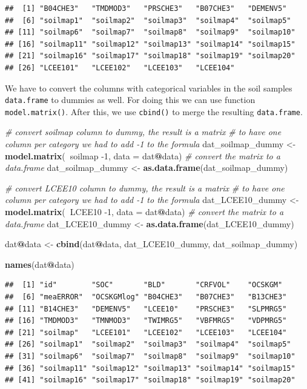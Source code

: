 \documentclass[10pt,b5paper,]{book}
\newenvironment{Shaded}{\begin{snugshade}}{\end{snugshade}}
\newcommand{\CommentTok}[1]{\textcolor[rgb]{0.56,0.35,0.01}{\textit{#1}}}
\newcommand{\DataTypeTok}[1]{\textcolor[rgb]{0.13,0.29,0.53}{#1}}
\newcommand{\DecValTok}[1]{\textcolor[rgb]{0.00,0.00,0.81}{#1}}
\newcommand{\KeywordTok}[1]{\textcolor[rgb]{0.13,0.29,0.53}{\textbf{#1}}}
\newcommand{\NormalTok}[1]{#1}
\newcommand{\OperatorTok}[1]{\textcolor[rgb]{0.81,0.36,0.00}{\textbf{#1}}}
\newcommand{\StringTok}[1]{\textcolor[rgb]{0.31,0.60,0.02}{#1}}
\theoremstyle{definition}
\theoremstyle{definition}
\theoremstyle{definition}
\theoremstyle{remark}
\begin{document}
\begin{verbatim}
##  [1] "B04CHE3"   "TMDMOD3"   "PRSCHE3"   "B07CHE3"   "DEMENV5"  
##  [6] "soilmap1"  "soilmap2"  "soilmap3"  "soilmap4"  "soilmap5" 
## [11] "soilmap6"  "soilmap7"  "soilmap8"  "soilmap9"  "soilmap10"
## [16] "soilmap11" "soilmap12" "soilmap13" "soilmap14" "soilmap15"
## [21] "soilmap16" "soilmap17" "soilmap18" "soilmap19" "soilmap20"
## [26] "LCEE101"   "LCEE102"   "LCEE103"   "LCEE104"
\end{verbatim}

We have to convert the columns with categorical variables in the soil
samples \texttt{data.frame} to dummies as well. For doing this we can
use function \texttt{model.matrix()}. After this, we use
\texttt{cbind()} to merge the resulting \texttt{data.frame}.

\begin{Shaded}
\begin{Highlighting}[]
\CommentTok{# convert soilmap column to dummy, the result is a matrix}
\CommentTok{# to have one column per category we had to add -1 to the formula}
\NormalTok{dat_soilmap_dummy <-}\StringTok{ }\KeywordTok{model.matrix}\NormalTok{(}\OperatorTok{~}\NormalTok{soilmap }\DecValTok{-1}\NormalTok{, }\DataTypeTok{data =}\NormalTok{ dat}\OperatorTok{@}\NormalTok{data)}
\CommentTok{# convert the matrix to a data.frame}
\NormalTok{dat_soilmap_dummy <-}\StringTok{ }\KeywordTok{as.data.frame}\NormalTok{(dat_soilmap_dummy)}


\CommentTok{# convert LCEE10 column to dummy, the result is a matrix}
\CommentTok{# to have one column per category we had to add -1 to the formula}
\NormalTok{dat_LCEE10_dummy <-}\StringTok{ }\KeywordTok{model.matrix}\NormalTok{(}\OperatorTok{~}\NormalTok{LCEE10 }\DecValTok{-1}\NormalTok{, }\DataTypeTok{data =}\NormalTok{ dat}\OperatorTok{@}\NormalTok{data)}
\CommentTok{# convert the matrix to a data.frame}
\NormalTok{dat_LCEE10_dummy <-}\StringTok{ }\KeywordTok{as.data.frame}\NormalTok{(dat_LCEE10_dummy)}

\NormalTok{dat}\OperatorTok{@}\NormalTok{data <-}\StringTok{ }\KeywordTok{cbind}\NormalTok{(dat}\OperatorTok{@}\NormalTok{data, dat_LCEE10_dummy, dat_soilmap_dummy)}

\KeywordTok{names}\NormalTok{(dat}\OperatorTok{@}\NormalTok{data)}
\end{Highlighting}
\end{Shaded}

\begin{verbatim}
##  [1] "id"        "SOC"       "BLD"       "CRFVOL"    "OCSKGM"   
##  [6] "meaERROR"  "OCSKGMlog" "B04CHE3"   "B07CHE3"   "B13CHE3"  
## [11] "B14CHE3"   "DEMENV5"   "LCEE10"    "PRSCHE3"   "SLPMRG5"  
## [16] "TMDMOD3"   "TMNMOD3"   "TWIMRG5"   "VBFMRG5"   "VDPMRG5"  
## [21] "soilmap"   "LCEE101"   "LCEE102"   "LCEE103"   "LCEE104"  
## [26] "soilmap1"  "soilmap2"  "soilmap3"  "soilmap4"  "soilmap5" 
## [31] "soilmap6"  "soilmap7"  "soilmap8"  "soilmap9"  "soilmap10"
## [36] "soilmap11" "soilmap12" "soilmap13" "soilmap14" "soilmap15"
## [41] "soilmap16" "soilmap17" "soilmap18" "soilmap19" "soilmap20"
\end{verbatim}
\end{document}
